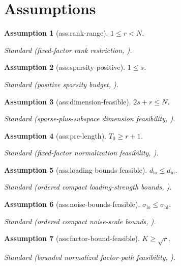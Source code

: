 \documentclass{article}
\newtheorem{assumption}{Assumption}
\begin{document}
\section{Assumptions}

\begin{assumption}[ass:rank-range]\label{ass:rank-range}
\(1\le r<N\).
\par\smallskip\noindent\emph{Standard} (fixed-factor rank restriction, \cite{HeLiShiMiao2026}).
\end{assumption}

\begin{assumption}[ass:sparsity-positive]\label{ass:sparsity-positive}
\(1\le s\).
\par\smallskip\noindent\emph{Standard} (positive sparsity budget, \cite{HeLiShiMiao2026}).
\end{assumption}

\begin{assumption}[ass:dimension-feasible]\label{ass:dimension-feasible}
\(2s+r\le N\).
\par\smallskip\noindent\emph{Standard} (sparse-plus-subspace dimension feasibility, \cite{ChandrasekaranEtAl2011}).
\end{assumption}

\begin{assumption}[ass:pre-length]\label{ass:pre-length}
\(T_0\ge r+1\).
\par\smallskip\noindent\emph{Standard} (fixed-factor normalization feasibility, \cite{HeLiShiMiao2026}).
\end{assumption}

\begin{assumption}[ass:loading-bounds-feasible]\label{ass:loading-bounds-feasible}
\(d_{\mathrm{lo}}\le d_{\mathrm{hi}}\).
\par\smallskip\noindent\emph{Standard} (ordered compact loading-strength bounds, \cite{HeLiShiMiao2026}).
\end{assumption}

\begin{assumption}[ass:noise-bounds-feasible]\label{ass:noise-bounds-feasible}
\(\sigma_{\mathrm{lo}}\le\sigma_{\mathrm{hi}}\).
\par\smallskip\noindent\emph{Standard} (ordered compact noise-scale bounds, \cite{HeLiShiMiao2026}).
\end{assumption}

\begin{assumption}[ass:factor-bound-feasible]\label{ass:factor-bound-feasible}
\(K\ge\sqrt r\).
\par\smallskip\noindent\emph{Standard} (bounded normalized factor-path feasibility, \cite{HeLiShiMiao2026}).
\end{assumption}
\end{document}
